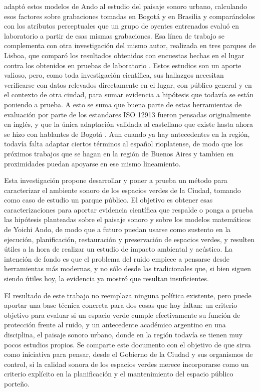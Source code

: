 \documentclass[11pt]{article}
\begin{document}
\textcite{hermida2019} adaptó estos modelos de Ando al estudio del paisaje sonoro urbano, calculando esos factores sobre grabaciones tomadas en Bogotá y en Brasilia y comparándolos con los atributos perceptuales que un grupo de oyentes entrenados evaluó en laboratorio a partir de esas mismas grabaciones. Esa línea de trabajo se complementa con otra investigación del mismo autor, realizada en tres parques de Lisboa, que comparó los resultados obtenidos con encuestas hechas en el lugar contra los obtenidos en pruebas de laboratorio \parencite{hermida2017}. Estos estudios son un aporte valioso, pero, como toda investigación científica, sus hallazgos necesitan verificarse con datos relevados directamente en el lugar, con público general y en el contexto de otra ciudad, para sumar evidencia a hipótesis que todavía se están poniendo a prueba. A esto se suma que buena parte de estas herramientas de evaluación por parte de los estandares ISO 12913 fueron pensadas originalmente en inglés, y que la única adaptación validada al castellano que existe hasta ahora se hizo con hablantes de Bogotá \parencite{useche2023}. Aun cuando ya hay antecedentes en la región, todavía falta adaptar ciertos términos al español rioplatense, de modo que los próximos trabajos que se hagan en la región de Buenos Aires y tambien en proximidades puedan apoyarse en ese mismo lineamiento.

Esta investigación propone desarrollar y poner a prueba un método para caracterizar el ambiente sonoro de los espacios verdes de la Ciudad, tomando como caso de estudio un parque público. El objetivo es obtener esas caracterizaciones para aportar evidencia científica que respalde o ponga a prueba las hipótesis planteadas sobre el paisaje sonoro y sobre los modelos matemáticos de Yoichi Ando, de modo que a futuro puedan usarse como sustento en la ejecución, planificación, restauración y preservación de espacios verdes, y resulten útiles a la hora de realizar un estudio de impacto ambiental y acústico. La intención de fondo es que el problema del ruido empiece a pensarse desde herramientas más modernas, y no sólo desde las tradicionales que, si bien siguen siendo útiles hoy, la evidencia ya mostró que resultan insuficientes.

El resultado de este trabajo no reemplaza ninguna política existente, pero puede aportar una base técnica concreta para dos cosas que hoy faltan: un criterio objetivo para evaluar si un espacio verde cumple efectivamente su función de protección frente al ruido, y un antecedente académico argentino en una disciplina, el paisaje sonoro urbano, donde en la región todavía se tienen muy pocos estudios propios. Se comparte este documento con el objetivo de que sirva como iniciativa para pensar, desde el Gobierno de la Ciudad y sus organismos de control, si la calidad sonora de los espacios verdes merece incorporarse como un criterio explícito en la planificación y el mantenimiento del espacio público porteño.
\end{document}
